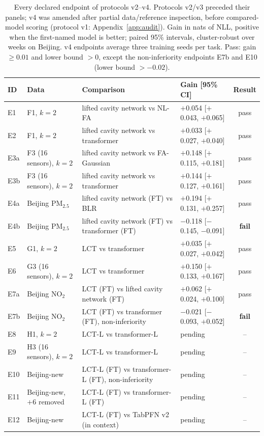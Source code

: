 \begin{table}[t]
\centering\scriptsize
\setlength{\tabcolsep}{3pt}
\caption{\label{tab:endpoints}Every declared endpoint of protocols v2--v4. Protocols v2/v3 preceded their panels; v4 was amended after partial data/reference inspection, before compared-model scoring (protocol v1: Appendix~\ref{app:audit}). Gain in nats of NLL, positive when the first-named model is better; paired 95\% intervals, cluster-robust over weeks on Beijing. v4 endpoints average three training seeds per task. Pass: gain $\geq0.01$ and lower bound $>0$, except the non-inferiority endpoints E7b and E10 (lower bound $>-0.02$).}
\begin{tabular}{llllc}
\toprule
ID & Data & Comparison & Gain [95\% CI] & Result\\
\midrule
E1 & F1, $k=2$ & lifted cavity network vs NL-FA & $+$0.054 [$+$0.043, $+$0.065] & pass\\
E2 & F1, $k=2$ & lifted cavity network vs transformer & $+$0.033 [$+$0.027, $+$0.040] & pass\\
E3a & F3 (16 sensors), $k=2$ & lifted cavity network vs FA-Gaussian & $+$0.148 [$+$0.115, $+$0.181] & pass\\
E3b & F3 (16 sensors), $k=2$ & lifted cavity network vs transformer & $+$0.144 [$+$0.127, $+$0.161] & pass\\
E4a & Beijing PM$_{2.5}$ & lifted cavity network (FT) vs BLR & $+$0.194 [$+$0.131, $+$0.257] & pass\\
E4b & Beijing PM$_{2.5}$ & lifted cavity network (FT) vs transformer (FT) & $-$0.118 [$-$0.145, $-$0.091] & \textbf{fail}\\
\midrule
E5 & G1, $k=2$ & LCT vs transformer & $+$0.035 [$+$0.027, $+$0.042] & pass\\
E6 & G3 (16 sensors), $k=2$ & LCT vs transformer & $+$0.150 [$+$0.133, $+$0.167] & pass\\
E7a & Beijing NO$_2$ & LCT (FT) vs lifted cavity network (FT) & $+$0.062 [$+$0.024, $+$0.100] & pass\\
E7b & Beijing NO$_2$ & LCT (FT) vs transformer (FT), non-inferiority & $-$0.021 [$-$0.093, $+$0.052] & \textbf{fail}\\
\midrule
E8 & H1, $k=2$ & LCT-L vs transformer-L & pending & --\\
E9 & H3 (16 sensors), $k=2$ & LCT-L vs transformer-L & pending & --\\
E10 & Beijing-new & LCT-L (FT) vs transformer-L (FT), non-inferiority & pending & --\\
E11 & Beijing-new, $+6$ removed & LCT-L (FT) vs transformer-L (FT) & pending & --\\
E12 & Beijing-new & LCT-L (FT) vs TabPFN v2 (in context) & pending & --\\
\bottomrule
\end{tabular}
\end{table}
